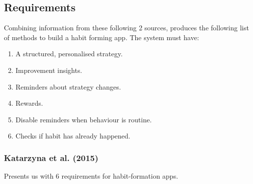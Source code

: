 \subsection{Requirements}
Combining information from these following 2 sources, produces the following list of methods to build a habit forming app.\newline
\newline
The system must have:

\begin{enumerate}
  \item A structured, personalised strategy.
  \item Improvement insights.
  \item Reminders about strategy changes.
  \item Rewards.
  \item Disable reminders when behaviour is routine.
  \item Checks if habit has already happened.
\end{enumerate}

\subsubsection*{Katarzyna et al. (2015)}

  Presents us with 6 requirements for habit-formation apps.

